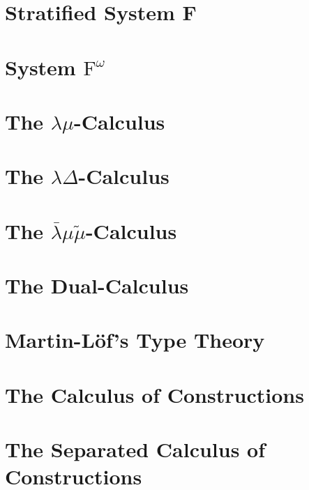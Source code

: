 \documentclass[phd,appendix,dedicationpage,ackpage,epigraphpage]{uithesis}
\newcommand{\LBMMT}[0]{\bar{\lambda}\mu\tilde\mu}
\begin{document}
\section{Stratified System F}
\label{sec:stratified_system_f}
\SSFall{}

\newpage
\section{System $\text{F}^\omega$}
\label{sec:system_fw}
\Fwall{}

\newpage
\section{The $\lambda\mu$-Calculus}
\label{sec:lamu_all}
\Lamuall{}

\newpage
\section{The $\lambda\Delta$-Calculus}
\label{sec:lamd_all}
\Lamdall{}

\newpage
\section{The $\LBMMT$-Calculus}
\label{sec:lbmmt_all}
\LBMMTall{}

\newpage
\section{The Dual-Calculus}
\label{sec:dc_all}
\DCall{}

\newpage
\section{Martin-L\"of's Type Theory}
\label{sec:tt_all}
\TTall{}

\newpage
\section{The Calculus of Constructions}
\label{sec:coc_all}
\CoCall{}

\newpage
\section{The Separated Calculus of Constructions}
\label{sec:coc_sep_all}
\CoCSall{}
\end{document}
